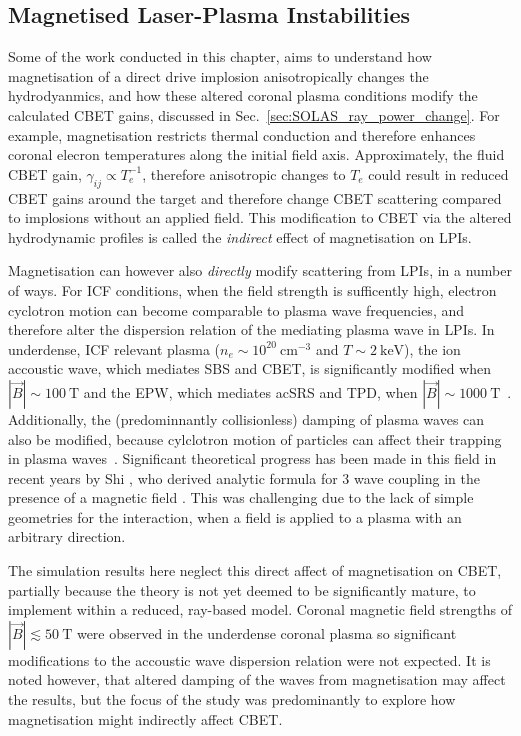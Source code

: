 \subsection{Magnetised Laser-Plasma Instabilities}%
\label{sec:Res2_maglpis}

Some of the work conducted in this chapter, aims to understand how magnetisation of a direct drive implosion anisotropically changes the hydrodyanmics, and how these altered coronal plasma conditions modify the calculated \ac{CBET} gains, discussed in Sec.~\ref{sec:SOLAS_ray_power_change}.
For example, magnetisation restricts thermal conduction and therefore enhances coronal elecron temperatures along the initial field axis.
Approximately, the fluid \ac{CBET} gain, $\gamma_{ij}\propto T_e^{-1}$, therefore anisotropic changes to $T_e$ could result in reduced \ac{CBET} gains around the target and therefore change \ac{CBET} scattering compared to implosions without an applied field.
This modification to \ac{CBET} via the altered hydrodynamic profiles is called the \textit{indirect} effect of magnetisation on \ac{LPIs}.

Magnetisation can however also \textit{directly} modify scattering from \ac{LPIs}, in a number of ways.
For \ac{ICF} conditions, when the field strength is sufficently high, electron cyclotron motion can become comparable to plasma wave frequencies, and therefore alter the dispersion relation of the mediating plasma wave in \ac{LPIs}.
In underdense, \ac{ICF} relevant plasma ($n_e\sim 10^{20}\ \text{cm}^{-3}$ and $T\sim2\ \text{keV}$), the ion accoustic wave, which mediates \ac{SBS} and \ac{CBET}, is significantly modified when $|\vec{B}|\sim100\ \text{T}$ and the \ac{EPW}, which mediates ac{SRS} and \ac{TPD}, when $|\vec{B}|\sim1000\ \text{T}$~\cite{shi_benchmarking_2023}.
Additionally, the (predominnantly collisionless) damping of plasma waves can also be modified, because cylclotron motion of particles can affect their trapping in plasma waves~\cite{shi_benchmarking_2023}.
Significant theoretical progress has been made in this field in recent years by Shi , who derived analytic formula for 3 wave coupling in the presence of a magnetic field \cite{shi_three-wave_2017,shi_laser-plasma_2018}.
This was challenging due to the lack of simple geometries for the interaction, when a field is applied to a plasma with an arbitrary direction.

The simulation results here neglect this direct affect of magnetisation on \ac{CBET}, partially because the theory is not yet deemed to be significantly mature, to implement within a reduced, ray-based model.
Coronal magnetic field strengths of $|\vec{B}|\lesssim50\ \text{T}$ were observed in the underdense coronal plasma so significant modifications to the accoustic wave dispersion relation were not expected.
It is noted however, that altered damping of the waves from magnetisation may affect the results, but the focus of the study was predominantly to explore how magnetisation might indirectly affect \ac{CBET}.

